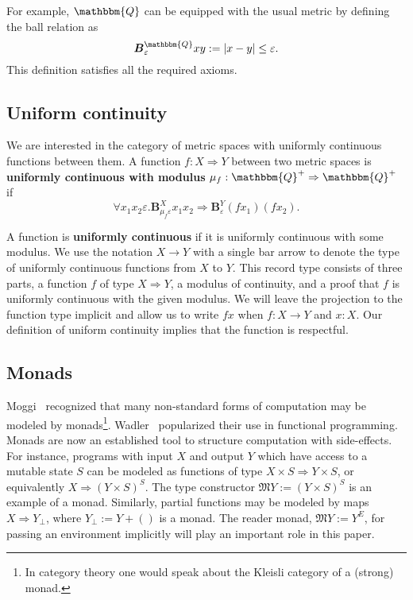\documentclass{elsarticle}
\newcommand{\assign}{:=}
\newcommand{\tmdfn}[1]{\textbf{#1}}
\newcommand{\tmmathbf}[1]{\ensuremath{\boldsymbol{#1}}}
\newcommand{\ballsym}{\ensuremath{\tmmathbf{B}}}
\newcommand{\ball}[4]{\ensuremath{\ballsym^{#1}_{#2}  #3  #4}}
\begin{document}
For example, $\mathbbm{Q}$ can be equipped with the usual metric by defining
the ball relation as
\[ \ball{\mathbbm{Q}}{\varepsilon}{x}{y} \assign |x - y| \leq \varepsilon . \]
This definition satisfies all the required axioms.

\subsection{Uniform continuity}We are interested in the category of metric
spaces with uniformly continuous functions between them. A function $f : X
\Rightarrow Y$ between two metric spaces is {\tmdfn{uniformly continuous with
modulus}} $\mu_f : \mathbbm{Q}^+ \Rightarrow \mathbbm{Q}^+$ if
\[ \forall x_1 x_2 \varepsilon . \ball{X}{\mu_f \varepsilon}{x_1}{x_2}
   \Rightarrow \ball{Y}{\varepsilon}{(f x_1)}{(f x_2)} \text{.} \]


A function is {\tmdfn{uniformly continuous}} if it is uniformly continuous
with some modulus. We use the notation $X \rightarrow Y$ with a single bar
arrow to denote the type of uniformly continuous functions from $X$ to $Y$.
This record type consists of three parts, a function $f$ of type $X
\Rightarrow Y$, a modulus of continuity, and a proof that $f$ is uniformly
continuous with the given modulus. We will leave the projection to the
function type implicit and allow us to write $f x$ when $f : X \rightarrow Y$
and $x : X$. Our definition of uniform continuity implies that the function is
respectful.

\subsection{Monads}Moggi~{\cite{moggi:1989}} recognized that many non-standard
forms of computation may be modeled by monads{\footnote{In category theory one
would speak about the Kleisli category of a (strong) monad.}}.
Wadler~{\cite{Wadler92a}} popularized their use in functional programming.
Monads are now an established tool to structure computation with side-effects.
For instance, programs with input $X$ and output $Y$ which have access to a
mutable state $S$ can be modeled as functions of type $X \times S \Rightarrow
Y \times S$, or equivalently $X \Rightarrow (Y \times S)^S$. The type
constructor $\mathfrak{M}Y \assign (Y \times S)^S$ is an example of a monad.
Similarly, partial functions may be modeled by maps $X \Rightarrow Y_{\bot}$,
where $Y_{\bot} \assign Y + ()$ is a monad. The reader monad, $\mathfrak{M}Y
\assign Y^E$, for passing an environment implicitly will play an important
role in this paper.
\end{document}
